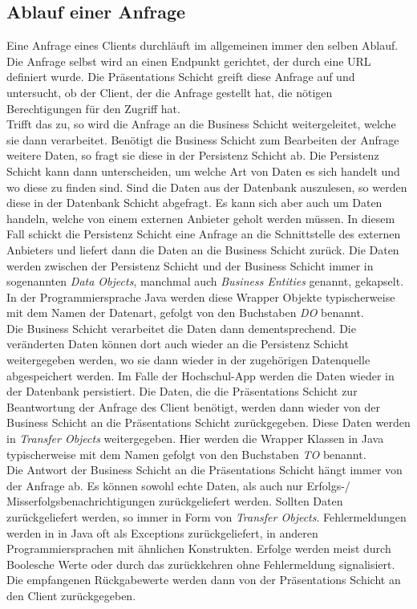 \subsection*{Ablauf einer Anfrage}

Eine Anfrage eines Clients durchläuft im allgemeinen immer den selben Ablauf. Die Anfrage selbst wird an einen Endpunkt gerichtet, der durch eine \ac{URL} definiert wurde. Die Präsentations Schicht greift diese Anfrage auf und untersucht, ob der Client, der die Anfrage gestellt hat, die nötigen Berechtigungen für den Zugriff hat.
\\
\linebreak
Trifft das zu, so wird die Anfrage an die Business Schicht weitergeleitet, welche sie dann verarbeitet. Benötigt die Business Schicht zum Bearbeiten der Anfrage weitere Daten, so fragt sie diese in der Persistenz Schicht ab. Die Persistenz Schicht kann dann unterscheiden, um welche Art von Daten es sich handelt und wo diese zu finden sind. Sind die Daten aus der Datenbank auszulesen, so werden diese in der Datenbank Schicht abgefragt. Es kann sich aber auch um Daten handeln, welche von einem externen Anbieter geholt werden müssen. In diesem Fall schickt die Persistenz Schicht eine Anfrage an die Schnittstelle des externen Anbieters und liefert dann die Daten an die Business Schicht zurück. Die Daten werden zwischen der Persistenz Schicht und der Business Schicht immer in sogenannten \textit{Data Objects}, manchmal auch \textit{Business Entities} genannt, gekapselt. In der Programmiersprache Java werden diese Wrapper Objekte typischerweise mit dem Namen der Datenart, gefolgt von den Buchstaben \textit{\ac{DO}} benannt. 
\\
\linebreak
Die Business Schicht verarbeitet die Daten dann dementsprechend. Die veränderten Daten können dort auch wieder an die Persistenz Schicht weitergegeben werden, wo sie dann wieder in der zugehörigen Datenquelle abgespeichert werden. Im Falle der Hochschul-\ac{App} werden die Daten wieder in der Datenbank persistiert. Die Daten, die die Präsentations Schicht zur Beantwortung der Anfrage des Client benötigt, werden dann wieder von der Business Schicht an die Präsentations Schicht zurückgegeben. Diese Daten werden in \textit{Transfer Objects} weitergegeben. Hier werden die Wrapper Klassen in Java typischerweise mit dem Namen gefolgt von den Buchstaben \textit{\ac{TO}} benannt. 
\\
\linebreak
Die Antwort der Business Schicht an die Präsentations Schicht hängt immer von der Anfrage ab. Es können sowohl echte Daten, als auch nur Erfolgs-/ Misserfolgsbenachrichtigungen zurückgeliefert werden. Sollten Daten zurückgeliefert werden, so immer in Form von \textit{Transfer Objects}. Fehlermeldungen werden in in Java oft als Exceptions zurückgeliefert, in anderen Programmiersprachen mit ähnlichen Konstrukten. Erfolge werden meist durch Boolesche Werte oder durch das zurückkehren ohne Fehlermeldung signalisiert. Die empfangenen Rückgabewerte werden dann von der Präsentations Schicht an den Client zurückgegeben.
